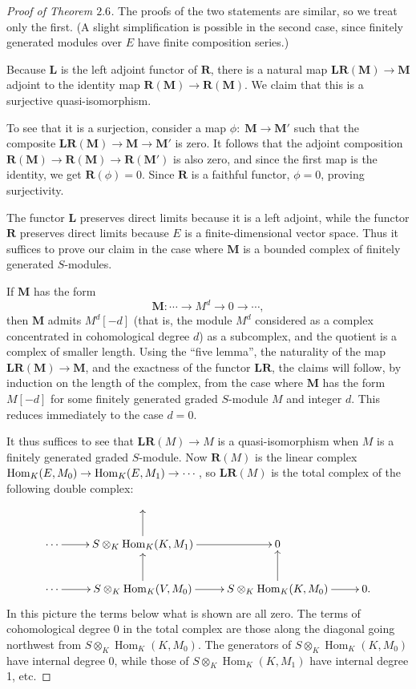 \documentclass{tran-l}
\newcommand{\myHom}{\operatorname{Hom}}
\newcommand{\LL}{\mathbf{L}}
\newcommand{\MM}{\mathbf{M}}
\newcommand{\RR}{\mathbf{R}}
\theoremstyle{plain}
\theoremstyle{remark}
\theoremstyle{definition}
\begin{document}
\begin{proof}[Proof of Theorem $2.6$]
The proofs of the two statements are similar,
so we treat only the first. (A slight simplification
is possible in the second case, since
finitely generated modules over $E$ have
finite composition series.)

Because $\LL $ is the left adjoint functor of $\RR $, there is a
natural map $\LL \RR (\MM )\to \MM $ adjoint to the identity map
$\RR (\MM )\to \RR (\MM )$. We claim that this is a surjective
quasi-isomorphism.

To see that it is a surjection,
consider a map $\phi :\; \MM \to \MM '$ such that the composite
$\LL \RR (\MM )\to \MM \to \MM '$ is zero. It follows that
the adjoint composition $\RR (\MM )\to \RR (\MM )\to \RR (\MM ')$
is also zero, and since the first map is the identity,
we get $\RR (\phi )=0$. Since $\RR $ is a faithful functor,
$\phi =0$, proving surjectivity.

The functor $\LL $ preserves direct limits because it is a left
adjoint, while the functor $\RR $ preserves direct limits because
$E$ is a finite-dimensional vector space. Thus it suffices
to prove our claim in the case where $\MM $ is a bounded complex
of finitely generated $S$-modules.

If $\MM $ has the form
\begin{equation*}\MM : \cdots \to M^{d}\to 0\to \cdots, \end{equation*}
then $\MM $ admits $M^{d}[ -d]$
(that is, the module $M^{d}$ considered as
a complex concentrated in cohomological degree $d$) as a subcomplex, and
the quotient is a complex of smaller length. Using the ``five lemma'',
the naturality of the map $\LL \RR (\MM ) \to \MM $, and the exactness
of the functor $\LL \RR $, the claims
will follow, by induction on the length of the complex,
from the case
where $\MM $ has the form $M[ -d]$ for some finitely generated
graded $S$-module $M$ and integer $d$. This reduces immediately
to the case $d=0$.

It thus suffices to see that
$\LL \RR (M)\to M$ is a quasi-isomorphism when $M$ is a finitely
generated graded $S$-module. Now $\RR (M)$ is the linear complex
$\myHom _{K}(E,M_{0})\linebreak\to \myHom _{K}(E,M_{1})\to \cdots $, so
$\LL \RR (M)$ is the total complex
of the following double complex:
\begin{equation*}\xy \xymatrix {
&\\
\dotsb \ar [r]&S\otimes _{K}\operatorname{Hom}_{K}(K,M_{1})\ar [u]\ar [r]&0\\
\dotsb \ar [r]&S\otimes _{K}\operatorname{Hom}_{K}(V,M_{0})\ar [r]\ar [u]
&S\otimes _{K}\operatorname{Hom}_{K}(K,M_{0})\ar [r]\ar [u]&0.
}
\endxy \end{equation*}
In this picture the terms below what is shown are all zero.
The terms of cohomological degree 0 in the total complex
are those along the diagonal going northwest from
$S\otimes _{K}\myHom _{K}(K,M_{0})$. The generators of
$S\otimes _{K}\myHom _{K}(K,M_{0})$ have internal degree 0, while those
of $S\otimes _{K}\myHom _{K}(K,M_{1})$ have internal degree 1, etc.


\end{proof}
\end{document}
